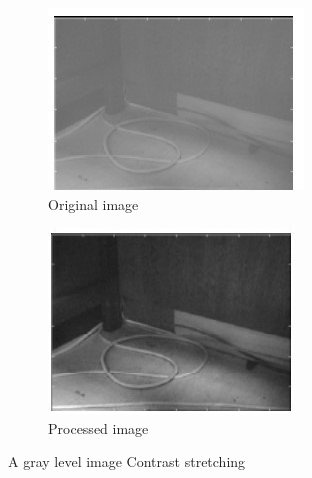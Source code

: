         \begin{figure}[h]
                \centering
                \begin{subfigure}[b]{0.46\textwidth}
                        \centering
                        \includegraphics[width=\textwidth]{chapiter1/figures/constrat-ori.jpg}
                        \caption{Original image}
                \end{subfigure}
                \hfill
                \begin{subfigure}[b]{0.46\textwidth}
                        \centering
                        \includegraphics[width=\textwidth]{chapiter1/figures/constart-processed.jpg}
                        \caption{Processed image}
                \end{subfigure}
                \caption{A gray level image Contrast stretching}
        \end{figure}

